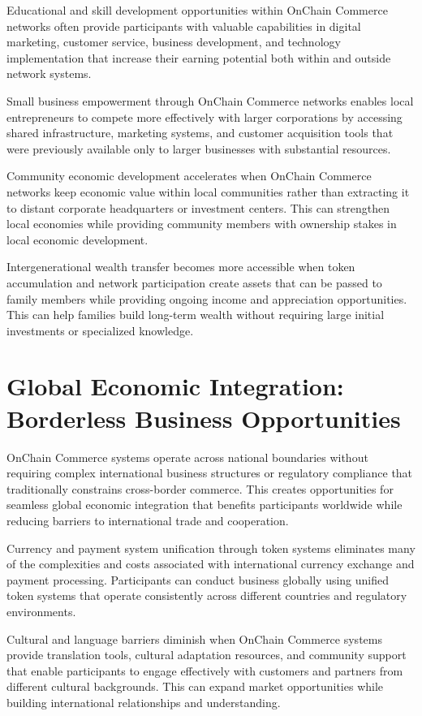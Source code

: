 \documentclass[
  Letterpaper,
]{scrbook}
\begin{document}
Educational and skill development opportunities within OnChain Commerce
networks often provide participants with valuable capabilities in
digital marketing, customer service, business development, and
technology implementation that increase their earning potential both
within and outside network systems.

Small business empowerment through OnChain Commerce networks enables
local entrepreneurs to compete more effectively with larger corporations
by accessing shared infrastructure, marketing systems, and customer
acquisition tools that were previously available only to larger
businesses with substantial resources.

Community economic development accelerates when OnChain Commerce
networks keep economic value within local communities rather than
extracting it to distant corporate headquarters or investment centers.
This can strengthen local economies while providing community members
with ownership stakes in local economic development.

Intergenerational wealth transfer becomes more accessible when token
accumulation and network participation create assets that can be passed
to family members while providing ongoing income and appreciation
opportunities. This can help families build long-term wealth without
requiring large initial investments or specialized knowledge.

\section{Global Economic Integration: Borderless Business
Opportunities}\label{global-economic-integration-borderless-business-opportunities}

OnChain Commerce systems operate across national boundaries without
requiring complex international business structures or regulatory
compliance that traditionally constrains cross-border commerce. This
creates opportunities for seamless global economic integration that
benefits participants worldwide while reducing barriers to international
trade and cooperation.

Currency and payment system unification through token systems eliminates
many of the complexities and costs associated with international
currency exchange and payment processing. Participants can conduct
business globally using unified token systems that operate consistently
across different countries and regulatory environments.

Cultural and language barriers diminish when OnChain Commerce systems
provide translation tools, cultural adaptation resources, and community
support that enable participants to engage effectively with customers
and partners from different cultural backgrounds. This can expand market
opportunities while building international relationships and
understanding.
\end{document}
